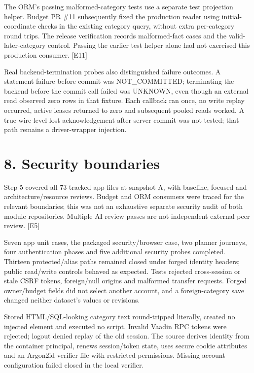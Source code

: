 \documentclass[11pt,a4paper]{article}
\begin{document}
The ORM's passing malformed-category tests use a separate test projection helper. Budget PR \#11 subsequently fixed the production reader using initial-coordinate checks in the existing category query, without extra per-category round trips. The release verification records malformed-fact cases and the valid-later-category control. Passing the earlier test helper alone had not exercised this production consumer. [E11]

Real backend-termination probes also distinguished failure outcomes. A statement failure before commit was NOT\_COMMITTED; terminating the backend before the commit call failed was UNKNOWN, even though an external read observed zero rows in that fixture. Each callback ran once, no write replay occurred, active leases returned to zero and subsequent pooled reads worked. A true wire-level lost acknowledgement after server commit was not tested; that path remains a driver-wrapper injection.

\section*{8. Security boundaries}

Step 5 covered all 73 tracked app files at snapshot A, with baseline, focused and architecture/\allowbreak{}resource reviews. Budget and ORM consumers were traced for the relevant boundaries; this was not an exhaustive separate security audit of both module repositories. Multiple AI review passes are not independent external peer review. [E5]

Seven app unit cases, the packaged security/\allowbreak{}browser case, two planner journeys, four authentication phases and five additional security probes completed. Thirteen protected/\allowbreak{}alias paths remained closed under forged identity headers; public read/\allowbreak{}write controls behaved as expected. Tests rejected cross-session or stale CSRF tokens, foreign/\allowbreak{}null origins and malformed transfer requests. Forged owner/\allowbreak{}budget fields did not select another account, and a foreign-category save changed neither dataset's values or revisions.

Stored HTML/\allowbreak{}SQL-looking category text round-tripped literally, created no injected element and executed no script. Invalid Vaadin RPC tokens were rejected; logout denied replay of the old session. The source derives identity from the container principal, renews session/\allowbreak{}token state, uses secure cookie attributes and an Argon2id verifier file with restricted permissions. Missing account configuration failed closed in the local verifier.
\end{document}
